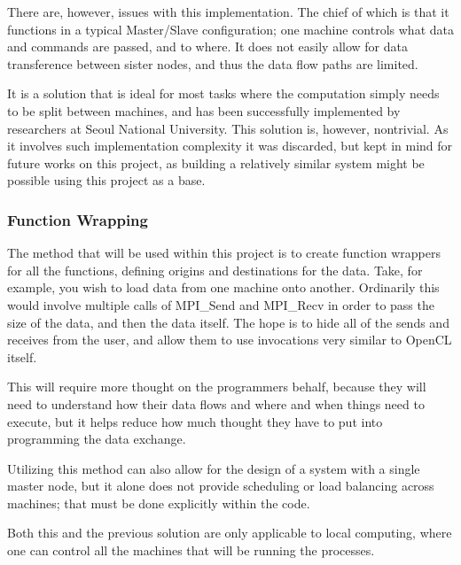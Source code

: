 \documentclass[../thesis.tex]{subfiles}
\begin{document}
            There are, however, issues with this implementation. The chief of which is that it functions in a typical Master/Slave configuration; one machine controls what data and commands are passed, and to where. It does not easily allow for data transference between sister nodes, and thus the data flow paths are limited.

            It is a solution that is ideal for most tasks where the computation simply needs to be split between machines, and has been successfully implemented by researchers at Seoul National University\cite{Kim:2012:SOF:2304576.2304623}. This solution is, however, nontrivial. As it involves such implementation complexity it was discarded, but kept in mind for future works on this project, as building a relatively similar system might be possible using this project as a base.
        \subsubsection{Function Wrapping} %
        \label{ssub:function_wrapping}
            The method that will be used within this project is to create function wrappers for all the functions, defining origins and destinations for the data. Take, for example, you wish to load data from one machine onto another. Ordinarily this would involve multiple calls of MPI\_Send and MPI\_Recv in order to pass the size of the data, and then the data itself. The hope is to hide all of the sends and receives from the user, and allow them to use invocations very similar to OpenCL itself.

            This will require more thought on the programmers behalf, because they will need to understand how their data flows and where and when things need to execute, but it helps reduce how much thought they have to put into programming the data exchange.

            Utilizing this method can also allow for the design of a system with a single master node, but it alone does not provide scheduling or load balancing across machines; that must be done explicitly within the code.

            Both this and the previous solution are only applicable to local computing, where one can control all the machines that will be running the processes.
\end{document}
